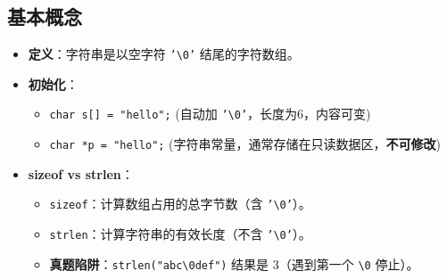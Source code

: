 \documentclass[a4paper,12pt]{article}
\begin{document}
\subsection{基本概念}
\begin{itemize}
    \item \textbf{定义}：字符串是以空字符 \texttt{'\textbackslash 0'} 结尾的字符数组。
    \item \textbf{初始化}：
    \begin{itemize}
        \item \texttt{char s[] = "hello";} (自动加 \texttt{'\textbackslash 0'}，长度为6，内容可变)
        \item \texttt{char *p = "hello";} (字符串常量，通常存储在只读数据区，\textbf{不可修改})
    \end{itemize}
    \item \textbf{sizeof vs strlen}：
    \begin{itemize}
        \item \texttt{sizeof}：计算数组占用的总字节数（含 \texttt{'\textbackslash 0'}）。
        \item \texttt{strlen}：计算字符串的有效长度（不含 \texttt{'\textbackslash 0'}）。
        \item \textbf{真题陷阱}：\texttt{strlen("abc\textbackslash 0def")} 结果是 3（遇到第一个 \texttt{\textbackslash 0} 停止）。
    \end{itemize}
\end{itemize}
\end{document}
